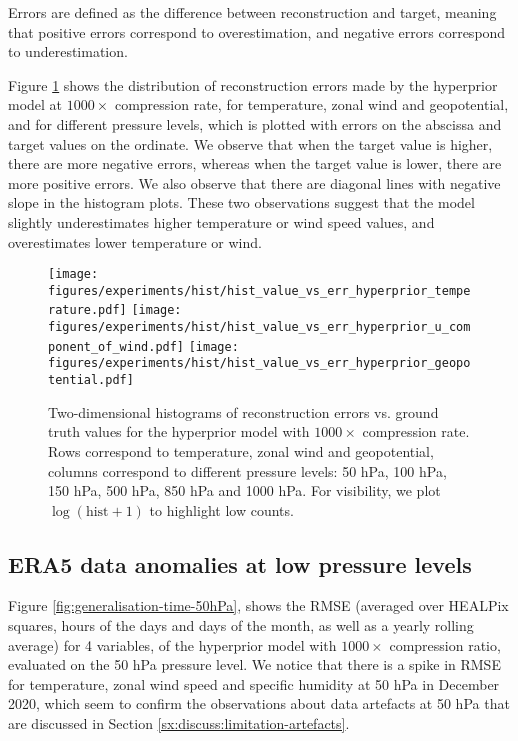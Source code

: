 Errors are defined as the difference between reconstruction and target, meaning that positive errors correspond to overestimation, and negative errors correspond to underestimation.

Figure \ref{fig:hist2d-err-value} shows the distribution of reconstruction errors made by the hyperprior model at $1000\times$ compression rate, for temperature, zonal wind and geopotential, and for different pressure levels, which is plotted with errors on the abscissa and target values on the ordinate. We observe that when the target value is higher, there are more negative errors, whereas when the target value is lower, there are more positive errors. We also observe that there are diagonal lines with negative slope in the histogram plots. These two observations suggest that the model slightly underestimates higher temperature or wind speed values, and overestimates lower temperature or wind.

\begin{figure}
    \centering
    \texttt{[image: figures/experiments/hist/hist\_value\_vs\_err\_hyperprior\_temperature.pdf]}
    \texttt{[image: figures/experiments/hist/hist\_value\_vs\_err\_hyperprior\_u\_component\_of\_wind.pdf]}
    \texttt{[image: figures/experiments/hist/hist\_value\_vs\_err\_hyperprior\_geopotential.pdf]}
    \hfill
    \caption{Two-dimensional histograms of reconstruction errors vs. ground truth values for the hyperprior model with $1000\times$ compression rate. Rows correspond to temperature, zonal wind and geopotential, columns correspond to different pressure levels: 50 hPa, 100 hPa, 150 hPa, 500 hPa, 850 hPa and 1000 hPa. For visibility, we plot $\log(\text{hist}+1)$ to highlight low counts.}
    \label{fig:hist2d-err-value}
\end{figure}

\subsection{ERA5 data anomalies at low pressure levels}
\label{sx:appendix:artefacts}

Figure \ref{fig:generalisation-time-50hPa}, shows the RMSE (averaged over HEALPix squares, hours of the days and days of the month, as well as a yearly rolling average) for 4 variables, of the hyperprior model with $1000\times$ compression ratio, evaluated on the 50 hPa pressure level. We notice that there is a spike in RMSE for temperature, zonal wind speed and specific humidity at 50 hPa in December 2020, which seem to confirm the observations about data artefacts at 50 hPa that are discussed in Section \ref{sx:discuss:limitation-artefacts}.

